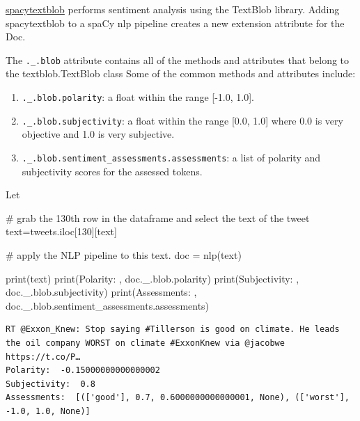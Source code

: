 \documentclass[
  letterpaper,
  DIV=11,
  numbers=noendperiod]{scrreprt}
\newenvironment{Shaded}{\begin{snugshade}}{\end{snugshade}}
\newcommand{\BuiltInTok}[1]{\textcolor[rgb]{0.00,0.23,0.31}{#1}}
\newcommand{\CommentTok}[1]{\textcolor[rgb]{0.37,0.37,0.37}{#1}}
\newcommand{\DecValTok}[1]{\textcolor[rgb]{0.68,0.00,0.00}{#1}}
\newcommand{\NormalTok}[1]{\textcolor[rgb]{0.00,0.23,0.31}{#1}}
\newcommand{\OperatorTok}[1]{\textcolor[rgb]{0.37,0.37,0.37}{#1}}
\newcommand{\StringTok}[1]{\textcolor[rgb]{0.13,0.47,0.30}{#1}}
\providecommand{\tightlist}{%
  \setlength{\itemsep}{0pt}\setlength{\parskip}{0pt}}\usepackage{longtable,booktabs,array}
\begin{document}
\href{https://spacytextblob.netlify.app/}{spacytextblob} performs
sentiment analysis using the TextBlob library. Adding spacytextblob to a
spaCy nlp pipeline creates a new extension attribute for the Doc.

The \texttt{.\_.blob} attribute contains all of the methods and
attributes that belong to the textblob.TextBlob class Some of the common
methods and attributes include:

\begin{enumerate}
\def\labelenumi{\arabic{enumi}.}
\tightlist
\item
  \texttt{.\_.blob.polarity}: a float within the range {[}-1.0, 1.0{]}.
\item
  \texttt{.\_.blob.subjectivity}: a float within the range {[}0.0,
  1.0{]} where 0.0 is very objective and 1.0 is very subjective.
\item
  \texttt{.\_.blob.sentiment\_assessments.assessments}: a list of
  polarity and subjectivity scores for the assessed tokens.
\end{enumerate}

Let

\begin{Shaded}
\begin{Highlighting}[]
\CommentTok{\# grab the 130th row in the dataframe and select the text of the tweet}
\NormalTok{text}\OperatorTok{=}\NormalTok{tweets.iloc[}\DecValTok{130}\NormalTok{][}\StringTok{\textquotesingle{}text\textquotesingle{}}\NormalTok{]}

\CommentTok{\# apply the NLP pipeline to this text.}
\NormalTok{doc }\OperatorTok{=}\NormalTok{ nlp(text)}

\BuiltInTok{print}\NormalTok{(text)}
\BuiltInTok{print}\NormalTok{(}\StringTok{\textquotesingle{}Polarity: \textquotesingle{}}\NormalTok{, doc.\_.blob.polarity)}
\BuiltInTok{print}\NormalTok{(}\StringTok{\textquotesingle{}Subjectivity: \textquotesingle{}}\NormalTok{, doc.\_.blob.subjectivity)}
\BuiltInTok{print}\NormalTok{(}\StringTok{\textquotesingle{}Assessments: \textquotesingle{}}\NormalTok{, doc.\_.blob.sentiment\_assessments.assessments)}
\end{Highlighting}
\end{Shaded}

\begin{verbatim}
RT @Exxon_Knew: Stop saying #Tillerson is good on climate. He leads the oil company WORST on climate #ExxonKnew via @jacobwe https://t.co/P…
Polarity:  -0.15000000000000002
Subjectivity:  0.8
Assessments:  [(['good'], 0.7, 0.6000000000000001, None), (['worst'], -1.0, 1.0, None)]
\end{verbatim}
\end{document}
